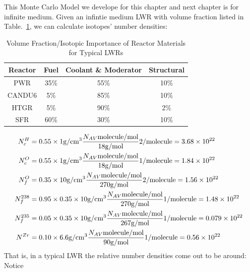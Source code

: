 \documentclass{school-22.211-notes}
\begin{document}
\clearpage
This Monte Carlo Model we develope for this chapter and next chapter is for infinite medium. 
Given an infintie medium LWR with volume fraction listed in Table.~\ref{volume-fraction}, we can calculate isotopes' number densities: 

\begin{table}[ht]
  \centering
  \begin{tabular}{|c|c|c|c|} \hline
    Reactor & Fuel & Coolant \& Moderator & Structural  \\ \hline \hline
    PWR & 35\% & 55\% & 10\% \\ \hline
    CANDU6 & 5\% & 85\% & 10\%  \\ \hline
    HTGR & 5\% & 90\% & 2\% \\ \hline
    SFR & 60\% & 30\% & 10\% \\ \hline
  \end{tabular}
  \caption{Volume Fraction/Isotopic Importance of Reactor Materials for Typical LWRs} \label{volume-fraction}
\end{table}

\begin{align}
N^H_c &= 0.55 \times 1 \mathrm{g}/\mathrm{cm}^3 \frac{N_{AV} \mathrm{molecule}/\mathrm{mol}}{18 \mathrm{g}/\mathrm{mol}} 2/\mathrm{molecule}  = 3.68 \times 10^{22} \\
N^O_c &= 0.55 \times 1 \mathrm{g}/\mathrm{cm}^3 \frac{N_{AV} \mathrm{molecule}/\mathrm{mol}}{18 \mathrm{g}/\mathrm{mol}} 1/\mathrm{molecule}  = 1.84 \times 10^{22} \\
N^O_f &= 0.35 \times 10 \mathrm{g}/\mathrm{cm}^3 \frac{N_{AV} \mathrm{molecule}/\mathrm{mol}}{270 \mathrm{g}/\mathrm{mol}} 2/\mathrm{molecule}  = 1.56 \times 10^{22} \\
N^{238}_f &= 0.95 \times 0.35 \times 10 \mathrm{g}/\mathrm{cm}^3 \frac{N_{AV} \mathrm{molecule}/\mathrm{mol}}{270 \mathrm{g}/\mathrm{mol}} 1/\mathrm{molecule}  = 1.48 \times 10^{22} \\
N^{235}_f &= 0.05 \times 0.35 \times 10 \mathrm{g}/\mathrm{cm}^3 \frac{N_{AV} \mathrm{molecule}/\mathrm{mol}}{267 \mathrm{g}/\mathrm{mol}} 1/\mathrm{molecule}  = 0.079 \times 10^{22} \\
N^{Zr} &= 0.10 \times 6.6 \mathrm{g}/\mathrm{cm}^3 \frac{N_{AV} \mathrm{molecule}/\mathrm{mol}}{90 \mathrm{g}/\mathrm{mol}} 1/\mathrm{molecule}  = 0.56 \times 10^{22} 
\end{align}
That is, in a typical LWR the relative number densities come out to be around: 
Notice  
\end{document}
